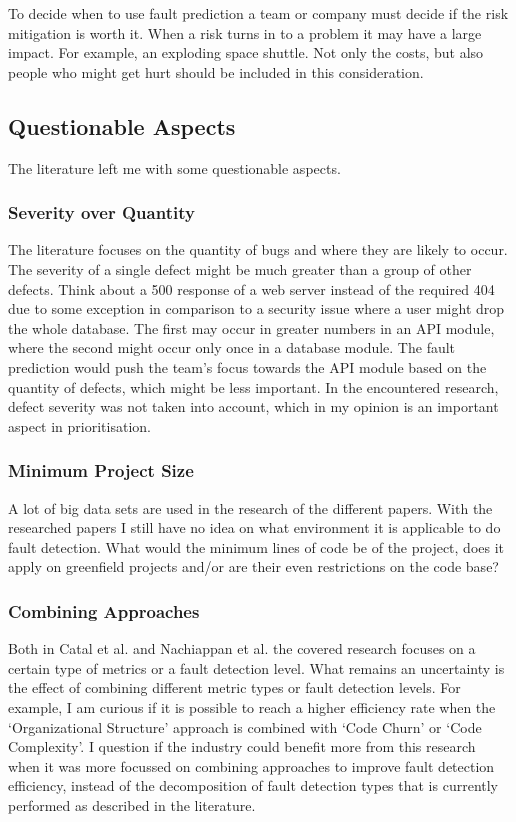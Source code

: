 To decide when to use fault prediction a team or company must decide if the risk mitigation is worth it.
When a risk turns in to a problem it may have a large impact. For example, an exploding space shuttle.
Not only the costs, but also people who might get hurt should be included in this consideration.

\subsection*{Questionable Aspects}

The literature left me with some questionable aspects.

\subsubsection*{Severity over Quantity}

The literature focuses on the quantity of bugs and where they are likely to occur.
The severity of a single defect might be much greater than a group of other defects.
Think about a 500 response of a web server instead of the required 404 due to some exception in comparison to a security issue where a user might drop the whole database.
The first may occur in greater numbers in an API module, where the second might occur only once in a database module.
The fault prediction would push the team's focus towards the API module based on the quantity of defects, which might be less important.
In the encountered research, defect severity was not taken into account, which in my opinion is an important aspect in prioritisation.

\subsubsection*{Minimum Project Size}

A lot of big data sets are used in the research of the different papers.
With the researched papers I still have no idea on what environment it is applicable to do fault detection.
What would the minimum lines of code be of the project, does it apply on greenfield projects and/or are their even restrictions on the code base?

\subsubsection*{Combining Approaches}

Both in Catal et al. \autocite{Catal20097346} and Nachiappan et al. \autocite{MAKING_SOFTWARE}
the covered research focuses on a certain type of metrics or a fault detection level.
What remains an uncertainty is the effect of combining different metric types or fault detection levels.
For example, I am curious if it is possible to reach a higher efficiency rate when the `Organizational Structure' approach is combined with `Code Churn' or `Code Complexity'.
I question if the industry could benefit more from this research when it was more focussed on combining approaches to improve fault detection efficiency, instead of the decomposition of fault detection types that is currently performed as described in the literature.

